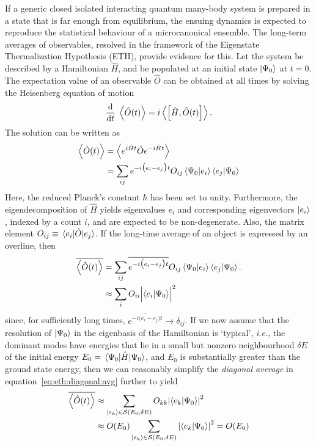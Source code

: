 \documentclass[%
 reprint,
superscriptaddress,
 amsmath,amssymb,
 aps,
prb,
]{revtex4-2}
\begin{document}
If a generic closed isolated interacting quantum many-body system is prepared in a state that is far enough from equilibrium, the ensuing dynamics is expected to reproduce the statistical behaviour of a microcanonical ensemble. The long-term averages of observables, resolved in the framework of the Eigenstate Thermalization Hypothesis (ETH), provide evidence for this. Let the system be described by a Hamiltonian $\hat{H}$, and be populated at an initial state $\ket{\Psi_0}$ at $t=0$. The expectation value of an observable $\hat{O}$ can be obtained at all times by solving the Heisenberg equation of motion
\begin{equation}
	\dv{t}\;\ev{\hat{O}(t)} = i \ev{\comm\Big{\hat{H}}{\hat{O}(t)}}.
\end{equation}
The solution can be written as
\begin{align}
	\expval{\hat{O}(t)} &= \expval{ e^{i\hat{H}t}\hat{O}e^{-i\hat{H}t}}\nonumber\\
	&= \sum_{ij}e^{-i\big(e_i-e_j\big)t}O_{ij}\ip{\Psi_0}{e_i}\ip{e_j}{\Psi_0}
\end{align}
Here, the reduced Planck's constant $\hbar$ has been set to unity. Furthermore, the eigendecomposition of $\hat{H}$ yields eigenvalues $e_i$ and corresponding eigenvectors $\ket{e_i}$, indexed by a count $i$, and are expected to be non-degenerate. Also, the matrix element $O_{ij}\equiv \mel{e_i}{\hat{O}}{e_j}$. If the long-time average of an object is expressed by an overline, then
\begin{align}
	\overline{\ev{\hat{O}(t)}} &= \sum_{ij}\overline{e^{-i\big(e_i-e_j\big)t}}O_{ij} \ip{\Psi_0}{e_i}\ip{e_j}{\Psi_0}.\nonumber\\
	&\approx\sum_i O_{ii} \abs\Big{ \ip{e_i}{\Psi_0}}^2
	\label{eq:eth:diagonal:avg}
\end{align}
since, for sufficiently long times, $\overline{e^{-i\big(e_i-e_j\big)t}}\rightarrow \delta_{ij}$. If we now assume that  the resolution of $\ket{\Psi_0}$ in the eigenbasis of the Hamiltonian is `typical', \textit{i.e.}, the dominant modes have energies that lie in a small but nonzero neighbourhood $\delta E$ of the initial energy $E_0 = \expval{\hat{H}}{\Psi_0}$, and $E_0$ is substantially greater than the ground state energy, then we can reasonably simplify the \textit{diagonal average} in equation~\ref{eq:eth:diagonal:avg} further to yield
\begin{align}
	\label{eq:eth:sumek}
	\overline{\ev{\hat{O}(t)}} &\approx \sum_{\ket{e_k}\in \mathcal{S}(E_0, \delta E)}O_{kk}\abs{\ip{e_k}{\Psi_0}}^2 \\
	\label{eq:eth:final}
	&\approx O(E_0) \sum_{\ket{e_k}\in \mathcal{S}(E_0, \delta E)}\abs{ \ip{e_k}{\Psi_0}}^2 = O(E_0)
\end{align}
\end{document}
